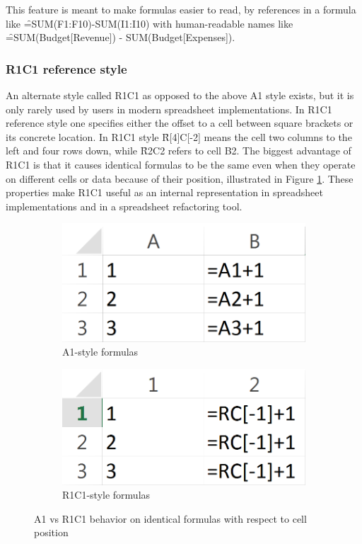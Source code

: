 This feature is meant to make formulas easier to read, by references in a formula like \f{=SUM(F1:F10)-SUM(I1:I10)} with human-readable names like \f{=SUM(Budget[Revenue]) - SUM(Budget[Expenses])}.

\subsubsection{R1C1 reference style}

An alternate style called R1C1 as opposed to the above A1 style exists, but it is only rarely used by users in modern spreadsheet implementations.
In R1C1 reference style one specifies either the offset to a cell between square brackets or its concrete location.
In R1C1 style \f{R[4]C[-2]} means the cell two columns to the left and four rows down, while \f{R2C2} refers to cell B2.
The biggest advantage of R1C1 is that it causes identical formulas to be the same even when they operate on different cells or data because of their position, illustrated in Figure \ref{fig:r1c1comp}.
These properties make R1C1 useful as an internal representation in spreadsheet implementations and in a spreadsheet refactoring tool.

\begin{figure}
\centerfloat
\begin{subfigure}[t]{0.35\textwidth}
\includegraphics[width=1\textwidth]{anatomy/r1c1comp-a1}
\caption{A1-style formulas}
\end{subfigure}
\hspace{0.1\textwidth}
\begin{subfigure}[t]{0.35\textwidth}
\includegraphics[width=1\textwidth]{anatomy/r1c1comp-r1c1}
\caption{R1C1-style formulas}
\end{subfigure}
\caption{A1 vs R1C1 behavior on identical formulas with respect to cell position}
\label{fig:r1c1comp}
\end{figure}


